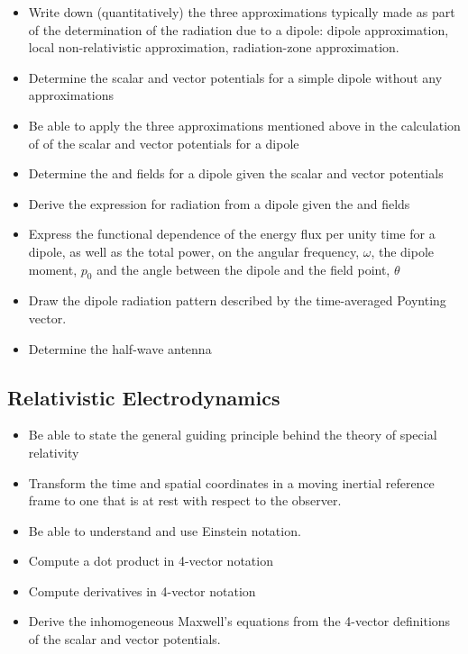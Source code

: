 \documentclass[12pt]{article}
\begin{document}
\begin{itemize}   
  \item Write down (quantitatively) the three approximations typically made as part of the determination of the radiation due to a dipole: dipole approximation, local non-relativistic approximation, radiation-zone approximation.
  \item Determine the scalar and vector potentials for a simple dipole without any approximations
  \item Be able to apply the three approximations mentioned above in the calculation of of the scalar and vector potentials for a dipole
  \item Determine the \Evec and \Bvec fields for a dipole given the scalar and vector potentials
  \item Derive the expression for radiation from a dipole given the \Evec and \Bvec fields
  \item Express the functional dependence of the energy flux per unity time for a dipole, as well as the total power, on the angular frequency, $\omega$, the dipole moment, $p_0$ and the angle between the dipole and the field point, $\theta$
  \item Draw the dipole radiation pattern described by the time-averaged Poynting vector. 
  \item Determine the half-wave antenna 
\end{itemize}


\subsection*{Relativistic Electrodynamics}

\begin{itemize}   
  \item Be able to state the general guiding principle behind the theory of special relativity
  \item Transform the time and spatial coordinates in a moving inertial reference frame to one that is at rest with respect to the observer.
  \item Be able to understand and use Einstein notation.
  \item Compute a dot product in 4-vector notation
  \item Compute derivatives in 4-vector notation
  \item Derive the inhomogeneous Maxwell's equations from the 4-vector definitions of the scalar and vector potentials.
\end{itemize}
\end{document}
